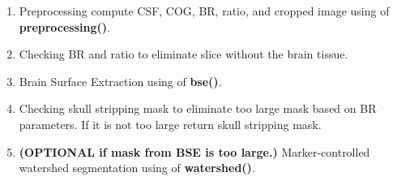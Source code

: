 \begin{enumerate}
    \item {Preprocessing compute CSF, COG, BR, ratio, and cropped image using of \textbf{preprocessing()}.}
    \item {Checking BR and ratio to eliminate slice without the brain tissue.}
    \item {Brain Surface Extraction using of \textbf{bse()}.}
    \item {Checking skull stripping mask to eliminate too large mask based on BR parameters. If it is not too large return skull stripping mask.}
    \item {\textbf{(OPTIONAL if mask from BSE is too large.)} Marker-controlled watershed segmentation using of \textbf{watershed()}.}
\end{enumerate}

